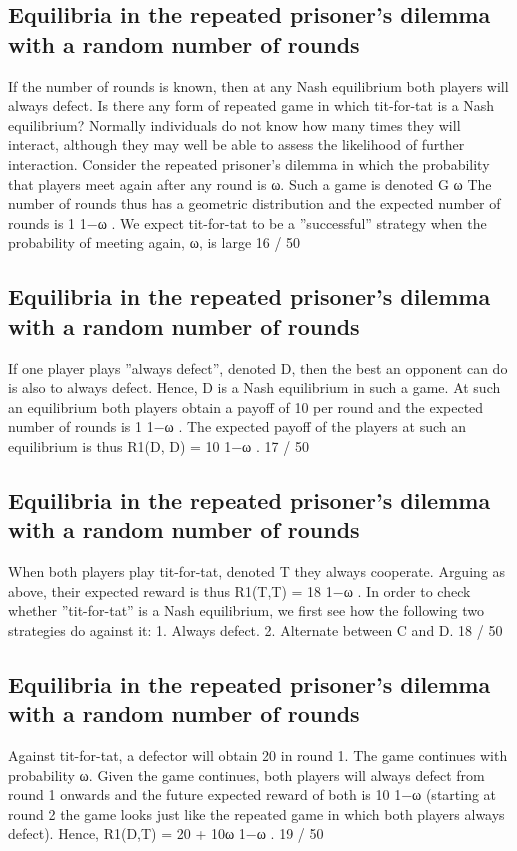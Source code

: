 \documentclass[]{report}
\begin{document}
\subsection{Equilibria in the repeated prisoner’s dilemma with a random number of rounds}
If the number of rounds is known, then at any Nash equilibrium
both players will always defect. Is there any form of repeated game
in which tit-for-tat is a Nash equilibrium?
Normally individuals do not know how many times they will
interact, although they may well be able to assess the likelihood of
further interaction.
Consider the repeated prisoner’s dilemma in which the probability
that players meet again after any round is ω. Such a game is
denoted G
ω
The number of rounds thus has a geometric distribution and the
expected number of rounds is 1
1−ω
. We expect tit-for-tat to be a
”successful” strategy when the probability of meeting again, ω, is
large
16 / 50
\subsection{Equilibria in the repeated prisoner’s dilemma with a random number of rounds}
If one player plays ”always defect”, denoted D, then the best an
opponent can do is also to always defect.
Hence, D is a Nash equilibrium in such a game.
At such an equilibrium both players obtain a payoff of 10 per round
and the expected number of rounds is 1
1−ω
.
The expected payoff of the players at such an equilibrium is thus
R1(D, D) = 10
1−ω
.
17 / 50
\subsection{Equilibria in the repeated prisoner’s dilemma with a random number of rounds}

When both players play tit-for-tat, denoted T they always
cooperate.
Arguing as above, their expected reward is thus R1(T,T) = 18
1−ω
.
In order to check whether ”tit-for-tat” is a Nash equilibrium, we
first see how the following two strategies do against it:
1. Always defect.
2. Alternate between C and D.
18 / 50
\subsection{Equilibria in the repeated prisoner’s dilemma with a random number of rounds}

Against tit-for-tat, a defector will obtain 20 in round 1. The game
continues with probability ω.
Given the game continues, both players will always defect from
round 1 onwards and the future expected reward of both is 10
1−ω
(starting at round 2 the game looks just like the repeated game in
which both players always defect).
Hence, R1(D,T) = 20 + 10ω
1−ω
.
19 / 50
\end{document}
